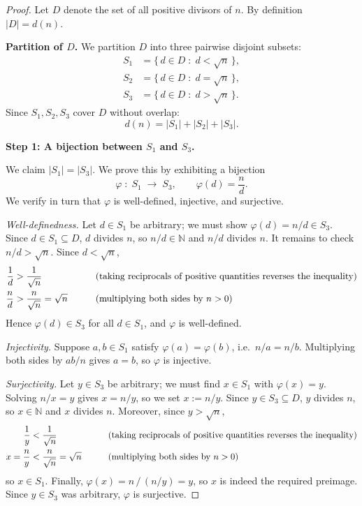 \documentclass[12pt]{article}
\theoremstyle{remark}
\begin{document}
\begin{proof}
Let $D$ denote the set of all positive divisors of $n$.  By definition
$|D| = d(n)$.

\smallskip
\noindent\textbf{Partition of $D$.}\;
We partition $D$ into three pairwise disjoint subsets:
\begin{align*}
    S_1 &= \bigl\{\, d \in D \;:\; d < \sqrt{n} \,\bigr\}, \\
    S_2 &= \bigl\{\, d \in D \;:\; d = \sqrt{n} \,\bigr\}, \\
    S_3 &= \bigl\{\, d \in D \;:\; d > \sqrt{n} \,\bigr\}.
\end{align*}
Since $S_1, S_2, S_3$ cover $D$ without overlap:
\[
    d(n) = |S_1| + |S_2| + |S_3|.
\]

\bigskip
\noindent\textbf{Step 1: A bijection between $S_1$ and $S_3$.}

We claim $|S_1| = |S_3|$. We prove this by exhibiting a bijection
\[
    \varphi \;:\; S_1 \;\longrightarrow\; S_3, \qquad \varphi(d) = \frac{n}{d}.
\]
We verify in turn that $\varphi$ is well-defined, injective, and surjective.

\medskip
\emph{Well-definedness.}\;
Let $d \in S_1$ be arbitrary; we must show $\varphi(d) = n/d \in S_3$.
Since $d \in S_1 \subseteq D$, $d$ divides $n$, so $n/d \in \mathbb{N}$ and
$n/d$ divides $n$. It remains to check $n/d > \sqrt{n}$. Since $d < \sqrt{n}$,
\begin{alignat}{2}
    \frac{1}{d} &> \frac{1}{\sqrt{n}}
        &\qquad& \text{(taking reciprocals of positive quantities reverses the inequality)} \notag \\
    \frac{n}{d} &> \frac{n}{\sqrt{n}} = \sqrt{n}
        &\qquad& \text{(multiplying both sides by $n > 0$)} \notag
\end{alignat}
Hence $\varphi(d) \in S_3$ for all $d \in S_1$, and $\varphi$ is well-defined.

\medskip
\emph{Injectivity.}\;
Suppose $a, b \in S_1$ satisfy $\varphi(a) = \varphi(b)$, i.e.\ $n/a = n/b$.
Multiplying both sides by $ab/n$ gives $a = b$, so $\varphi$ is injective.

\medskip
\emph{Surjectivity.}\;
Let $y \in S_3$ be arbitrary; we must find $x \in S_1$ with $\varphi(x) = y$.
Solving $n/x = y$ gives $x = n/y$, so we set $x := n/y$. Since
$y \in S_3 \subseteq D$, $y$ divides $n$, so $x \in \mathbb{N}$ and $x$ divides
$n$. Moreover, since $y > \sqrt{n}$,
\begin{alignat}{2}
    \frac{1}{y} &< \frac{1}{\sqrt{n}}
        &\qquad& \text{(taking reciprocals of positive quantities reverses the inequality)} \notag \\
    x = \frac{n}{y} &< \frac{n}{\sqrt{n}} = \sqrt{n}
        &\qquad& \text{(multiplying both sides by $n > 0$)} \notag
\end{alignat}
so $x \in S_1$. Finally, $\varphi(x) = n\,/\,(n/y) = y$, so $x$ is indeed the
required preimage. Since $y \in S_3$ was arbitrary, $\varphi$ is surjective.


\end{proof}
\end{document}
